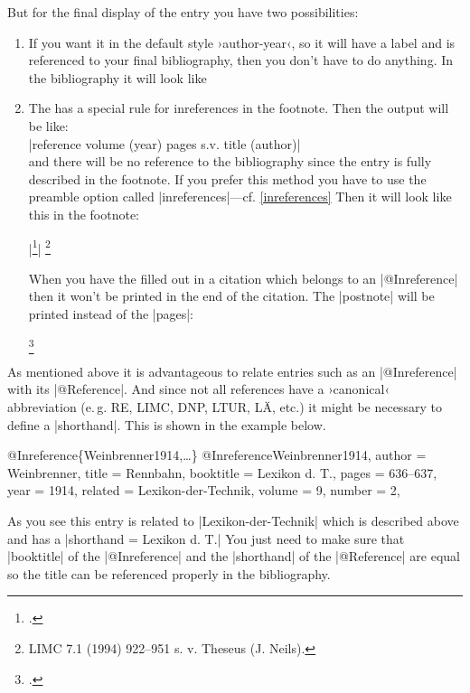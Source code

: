 \documentclass[a4paper,
10pt,
greek,
french,
spanish,
italian,
ngerman,
english
]{ltxdoc}
\begin{document}
But for the final display of the entry  you have two possibilities:
 \begin{enumerate}
\item\label{inreference:a} 

If you want it in the default style ›author-year‹, so it will have a label and is referenced 
to your final bibliography, then you don’t have to do anything.
In the bibliography it will look like

\item\label{inreference:b} 
The \DAI has a special rule for inreferences in the footnote.
Then the output will be like:\\
|reference volume (year) pages s.v. title (author)| \\
and there will be no reference to the bibliography since the entry is fully described in the footnote.
 If you prefer this method you have to use the preamble option called  |inreferences|---cf. \cref{inreferences}
Then it will look like this in the footnote:
\begin{examplebox}
|\footnote{\cite{Neils1994}.}|
\tcblower
\footnote{LIMC 7.1 (1994) 922--951 s. v. Theseus (J. Neils).}
\end{examplebox}
When you have the  filled out in a citation which belongs to an |@Inreference| then it won’t be printed in the end of the citation.
The |postnote|  will be printed instead of the |pages|:
\begin{example}
\footnote{\cite[vgl.][930 Nr. 283]{Neils1994}.}
\end{example} 
\end{enumerate}

As mentioned above it is  advantageous to relate entries such as  an |@Inreference| with its |@Reference|. 
And since not all references have a ›canonical‹ abbreviation (e.\,g. RE, LIMC, DNP, LTUR, LÄ, etc.) it might be necessary to define a |shorthand|.
This is shown in the example below.
 
\begin{bibexample}[label=Weinbrenner1914]{{@}Inreference\{Weinbrenner1914,…\}}
@Inreference{Weinbrenner1914,
  author    = {Weinbrenner},
  title     = {Rennbahn},
  booktitle = {Lexikon d. T.},
  pages     = {636--637},
  year      = {1914},
  related   = {Lexikon-der-Technik},
  volume    = {9},
  number    = {2},
}
\end{bibexample}
As you see this entry is related to |Lexikon-der-Technik| which is described above and has a |shorthand = {Lexikon d. T.}|
You just need to make sure that  |booktitle| of the |@Inreference| and the |shorthand| of 
the  |@Reference| are equal so the title can be referenced properly in the bibliography.
\end{document}
